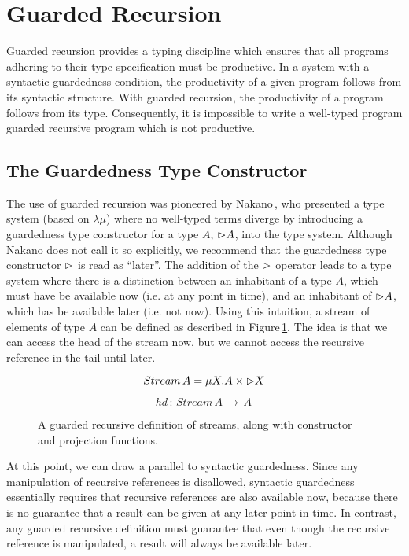 \section{Guarded Recursion}
\label{sec:guarded-recursion}

Guarded recursion provides a typing discipline which ensures that all programs adhering to their type specification must be productive. In a system with a syntactic guardedness condition, the productivity of a given program follows from its syntactic structure. With guarded recursion, the productivity of a program follows from its type. Consequently, it is impossible to write a well-typed program guarded recursive program which is not productive.

\subsection{The Guardedness Type Constructor}
The use of guarded recursion was pioneered by Nakano\,\citep{Nakano:2000}, who presented a type system (based on $\lambda \mu$) where no well-typed terms diverge by introducing a guardedness type constructor for a type $A$, $\rhd A$, into the type system. Although Nakano does not call it so explicitly, we recommend that the guardedness type constructor $\rhd$ is read as ``later''. The addition of the $\rhd$ operator leads to a type system where there is a distinction between an inhabitant of a type $A$, which must have be available now (i.e. at any point in time), and an inhabitant of $\rhd A$, which has be available later (i.e. not now). Using this intuition, a stream of elements of type $A$ can be defined as described in Figure\,\ref{fig:guarded_recursion_stream}. The idea is that we can access the head of the stream now, but we cannot access the recursive reference in the tail until later.

\begin{figure}
\[
Stream\,A = \mu X. A \times \rhd X
\]

\[
hd \, : \, Stream\,A\, \rightarrow \, A \, 
\]

\caption{A guarded recursive definition of streams, along with constructor and projection functions.}
\label{fig:guarded_recursion_stream}
\end{figure} 

At this point, we can draw a parallel to syntactic guardedness. Since any manipulation of recursive references is disallowed, syntactic guardedness essentially requires that recursive references are also available now, because there is no guarantee that a result can be given at any later point in time. In contrast, any guarded recursive definition must guarantee that even though the recursive reference is manipulated, a result will always be available later.

